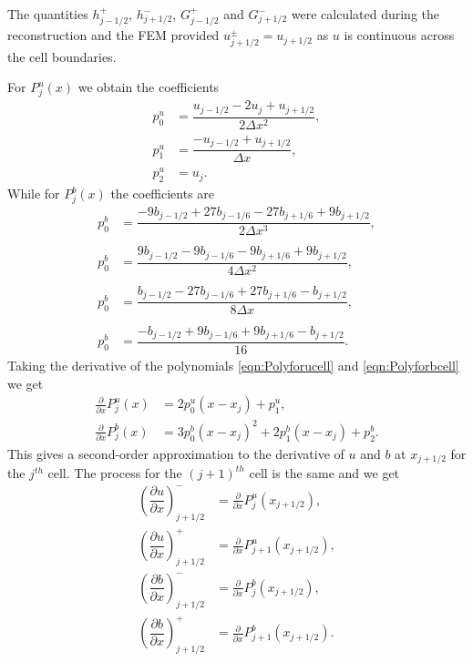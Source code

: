 \documentclass[times]{elsarticle}
\begin{document}
The quantities $h^+_{j - 1/2}$, $h^-_{j + 1/2}$, $G^+_{j - 1/2}$ and $G^-_{j + 1/2}$ were calculated during the reconstruction and the FEM provided $u^\pm_{j+1/2} = u_{j+1/2}$ as $u$ is continuous across the cell boundaries.

For $P^u_j(x)$ we obtain the coefficients
\begin{align*}
p^u_0 &=  \dfrac{u_{j-1/2} - 2u_j + u_{j+1/2}}{2 \Delta x^2},\\
p^u_1 &=  \dfrac{-u_{j-1/2} + u_{j+1/2}}{\Delta x},\\
p^u_2 &=  u_j.
\end{align*}
While for $P^b_j(x)$ the coefficients are
\begin{align*}
p^b_0 &=  \dfrac{-9b_{j-1/2} + 27b_{j-1/6} - 27 b_{j+1/6} + 9b_{j+1/2}}{2 \Delta x^3},\\ \\
p^b_0 &=  \dfrac{9b_{j-1/2} - 9b_{j-1/6} - 9b_{j+1/6} + 9b_{j+1/2}}{4 \Delta x^2},\\ \\ 
p^b_0 &=  \dfrac{b_{j-1/2} - 27b_{j-1/6} + 27 b_{j+1/6} - b_{j+1/2}}{8 \Delta x},\\\\
p^b_0 &=  \dfrac{-b_{j-1/2}  + 9b_{j-1/6} + 9 b_{j+1/6} - b_{j+1/2}}{16}.
\end{align*}
Taking the derivative of the polynomials \eqref{eqn:Polyforucell} and \eqref{eqn:Polyforbcell} we get
\begin{align*}
\frac{\partial }{\partial x}P^u_j(x) &= 2p^u_0 \left(x - x_j\right) + p^u_1, \\
\frac{\partial }{\partial x}P^b_j(x) &= 3p^b_0 \left(x - x_j\right)^2 + 2p^b_1 \left(x - x_j\right) + p^b_2.
\end{align*}
This gives a second-order approximation to the derivative of $u$ and $b$ at $x_{j+1/2}$ for the $j^{th}$ cell. The process for the $(j+1)^{th}$ cell is the same and we get 
\begin{align*}
\left(\dfrac{\partial {u}}{\partial x} \right)^-_{j + 1/2} &= \frac{\partial }{\partial x}P^u_j(x_{j+1/2}),  \\
\left(\dfrac{\partial {u}}{\partial x} \right)^+_{j + 1/2} &= \frac{\partial }{\partial x}P^u_{j+1}(x_{j+1/2}),  \\
\left(\dfrac{\partial {b}}{\partial x} \right)^-_{j + 1/2} &= \frac{\partial }{\partial x}P^b_j(x_{j+1/2}), \\
\left(\dfrac{\partial {b}}{\partial x} \right)^+_{j + 1/2} &= \frac{\partial }{\partial x}P^b_{j+1}(x_{j+1/2}). 	\end{align*}
\end{document}
